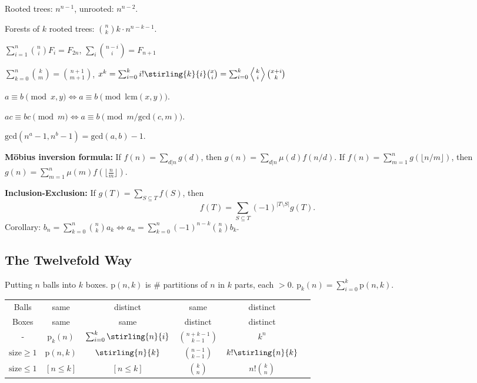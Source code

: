 \begin{myitemize}
	\item Rooted trees: $n^{n-1}$, unrooted: $n^{n-2}$.
	\item Forests of $k$ rooted trees: $\binom{n}{k} k \cdot n^{n-k-1}$.
	\item $\sum_{i=1}^n \binom{n}{i} F_i = F_{2n}$, \quad $\sum_{i} \binom{n-i}{i} = F_{n+1}$
	\item $\sum_{k=0}^n \binom{k}{m} = \binom{n+1}{m+1}$, \quad $x^k = \sum_{i=0}^k i!\stirling{k}{i}\binom{x}{i} = \sum_{i=0}^k \left\langle {k \atop i} \right\rangle\binom{x+i}{k}$
	\item $a\equiv b \pmod{x,y} \Leftrightarrow a \equiv b \pmod{\mathrm{lcm}(x,y)}$.
	\item $ac \equiv bc \pmod{m} \Leftrightarrow a \equiv b \pmod{m/\mathrm{gcd}(c,m)}$.
	\item $\mathrm{gcd}(n^a-1,n^b-1) = \mathrm{gcd}(a,b)-1$.
	\item \textbf{Möbius inversion formula:} If $f(n) = \sum_{d|n} g(d)$, then $g(n) = \sum_{d|n} \mu(d) f(n/d)$. If $f(n) = \sum_{m=1}^n g(\lfloor n/m\rfloor)$, then $g(n) = \sum_{m=1}^n \mu(m)f(\lfloor\frac{n}{m}\rfloor)$.
	\item \textbf{Inclusion-Exclusion:} If $g(T) = \sum_{S \subseteq T} f(S)$, then
	\[
		f(T) = \sum_{S \subseteq T} (-1)^{\lvert T \setminus S \rvert} g(T).
	\]
	Corollary:
		$b_n = \sum_{k=0}^{n} \binom{n}{k} a_k \Longleftrightarrow a_n = \sum_{k=0}^{n} (-1)^{n-k} \binom{n}{k} b_k$.
\end{myitemize}

\subsection{The Twelvefold Way}
Putting $n$ balls into $k$ boxes.
$\mathrm{p}(n,k)$ is \# partitions of $n$ in $k$ parts, each $>0$.
$\mathrm{p}_k(n) = \sum_{i=0}^k \mathrm{p}(n,k)$.

\begin{tabular}{@{}c|c|c|c|c|l@{}}
	Balls & same & distinct & same & distinct\\
	Boxes & same & same & distinct & distinct\\
	\hline
	- & $\mathrm{p}_k(n)$ & $\sum_{i=0}^k \stirling{n}{i}$ & $\binom{n+k-1}{k-1}$ & $k^n$ \\ 
	$\mathrm{size}\ge 1$ & $\mathrm{p}(n,k)$ & $\stirling{n}{k}$ & $\binom{n-1}{k-1}$ & $k!\stirling{n}{k}$ \\
	$\mathrm{size}\le 1$ & $[n \le k]$ & $[n \le k]$ & $\binom{k}{n}$ & $n!\binom{k}{n}$ \\
	\bottomrule
\end{tabular}

